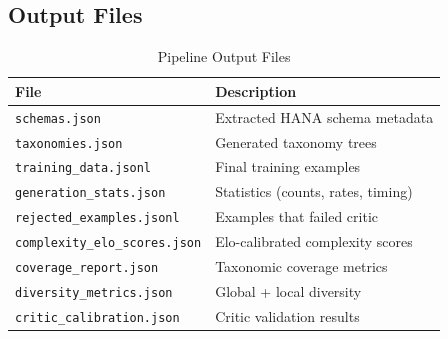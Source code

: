 \subsection{Output Files}

\begin{table}[H]
\centering
\caption{Pipeline Output Files}
\label{tab:outputs}
\begin{tabularx}{\textwidth}{lX}
\toprule
\textbf{File} & \textbf{Description} \\
\midrule
\texttt{schemas.json} & Extracted HANA schema metadata \\
\texttt{taxonomies.json} & Generated taxonomy trees \\
\texttt{training\_data.jsonl} & Final training examples \\
\texttt{generation\_stats.json} & Statistics (counts, rates, timing) \\
\texttt{rejected\_examples.jsonl} & Examples that failed critic \\
\texttt{complexity\_elo\_scores.json} & Elo-calibrated complexity scores \\
\texttt{coverage\_report.json} & Taxonomic coverage metrics \\
\texttt{diversity\_metrics.json} & Global + local diversity \\
\texttt{critic\_calibration.json} & Critic validation results \\
\bottomrule
\end{tabularx}
\end{table}

\newpage